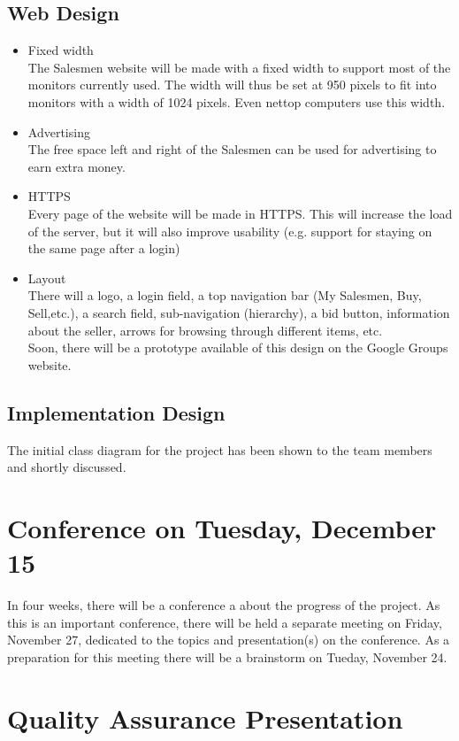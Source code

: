 \documentclass[a4paper, 12pt]{article}
\begin{document}
		\subsection{Web Design}
		\begin{itemize}
		\item Fixed width \\
The Salesmen website will be made with a fixed width to support most of the monitors currently used. The width will thus be set at 950 pixels to fit into monitors with a width of 1024 pixels. Even nettop computers use this width.
		\item Advertising \\
The free space left and right of the Salesmen can be used for advertising to earn extra money.
		\item HTTPS \\
Every page of the website will be made in HTTPS. This will increase the load of the server, but it will also improve usability (e.g. support for staying on the same page after a login)
		\item Layout \\
There will a logo, a login field, a top navigation bar (My Salesmen, Buy, Sell,etc.), a search field, sub-navigation (hierarchy), a bid button, information about the seller, arrows for browsing through different items, etc. \\
Soon, there will be a prototype available of this design on the Google Groups website.
		\end{itemize}

		\subsection{Implementation Design}
The initial class diagram for the project has been shown to the team members and shortly discussed.

	\section{Conference on Tuesday, December 15}
In four weeks, there will be a conference a about the progress of the  project. As this is an important conference, there will be held a separate meeting  on Friday, November 27, dedicated to the topics and presentation(s) on the conference. As a preparation for this meeting there will be a brainstorm on Tueday, November 24.

	\section{Quality Assurance Presentation}
	
\end{document}

